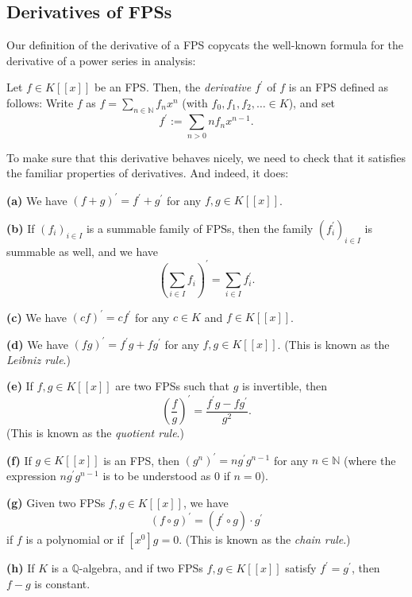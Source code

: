 \subsection{Derivatives of FPSs}

Our definition of the derivative of a FPS copycats the well-known formula for
the derivative of a power series in analysis:

\begin{definition}
\label{def.fps.deriv}Let $f\in K\left[  \left[  x\right]  \right]  $ be an
FPS. Then, the \emph{derivative} $f^{\prime}$ of $f$ is an FPS defined as
follows: Write $f$ as $f=\sum_{n\in\mathbb{N}}f_{n}x^{n}$ (with $f_{0}%
,f_{1},f_{2},\ldots\in K$), and set%
\[
f^{\prime}:=\sum_{n>0}nf_{n}x^{n-1}.
\]

\end{definition}

To make sure that this derivative behaves nicely, we need to check that it
satisfies the familiar properties of derivatives. And indeed, it does:

\begin{theorem}
\label{thm.fps.deriv.rules}\textbf{(a)} We have $\left(  f+g\right)  ^{\prime
}=f^{\prime}+g^{\prime}$ for any $f,g\in K\left[  \left[  x\right]  \right]
$. \medskip

\textbf{(b)} If $\left(  f_{i}\right)  _{i\in I}$ is a summable family of
FPSs, then the family $\left(  f_{i}^{\prime}\right)  _{i\in I}$ is summable
as well, and we have%
\[
\left(  \sum_{i\in I}f_{i}\right)  ^{\prime}=\sum_{i\in I}f_{i}^{\prime}.
\]


\textbf{(c)} We have $\left(  cf\right)  ^{\prime}=cf^{\prime}$ for any $c\in
K$ and $f\in K\left[  \left[  x\right]  \right]  $. \medskip

\textbf{(d)} We have $\left(  fg\right)  ^{\prime}=f^{\prime}g+fg^{\prime}$
for any $f,g\in K\left[  \left[  x\right]  \right]  $. (This is known as the
\emph{Leibniz rule}.) \medskip

\textbf{(e)} If $f,g\in K\left[  \left[  x\right]  \right]  $ are two FPSs
such that $g$ is invertible, then%
\[
\left(  \dfrac{f}{g}\right)  ^{\prime}=\dfrac{f^{\prime}g-fg^{\prime}}{g^{2}%
}.
\]
(This is known as the \emph{quotient rule}.) \medskip

\textbf{(f)} If $g\in K\left[  \left[  x\right]  \right]  $ is an FPS, then
$\left(  g^{n}\right)  ^{\prime}=ng^{\prime}g^{n-1}$ for any $n\in\mathbb{N}$
(where the expression $ng^{\prime}g^{n-1}$ is to be understood as $0$ if
$n=0$). \medskip

\textbf{(g)} Given two FPSs $f,g\in K\left[  \left[  x\right]  \right]  $, we
have
\[
\left(  f\circ g\right)  ^{\prime}=\left(  f^{\prime}\circ g\right)  \cdot
g^{\prime}%
\]
if $f$ is a polynomial or if $\left[  x^{0}\right]  g=0$. (This is known as
the \emph{chain rule}.) \medskip

\textbf{(h)} If $K$ is a $\mathbb{Q}$-algebra, and if two FPSs $f,g\in
K\left[  \left[  x\right]  \right]  $ satisfy $f^{\prime}=g^{\prime}$, then
$f-g$ is constant.
\end{theorem}

